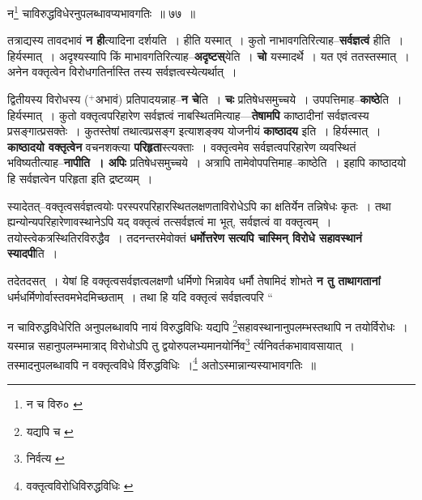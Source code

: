 \documentclass[article,12pt,a4paper]{memoir}
\newcommand{\add}[1]{($^{+}$#1)}
\begin{document}
	  \endgroup
	
	  \bigskip
	  \begingroup
	

	  \pstart न\footnote{न च विरु० \cite{dp-msC}} चाविरुद्धविधेरनुपलब्धावप्यभावगतिः ॥ ७७ ॥
	\pend
      
	  \endgroup
	

	  \pstart तत्राद्यस्य तावदभावं \textbf{न ही}त्यादिना दर्शयति । हीति यस्मात् । कुतो नाभावगतिरित्याह--\textbf{सर्वज्ञत्वं} हीति । हिर्यस्मात् । अदृश्यस्यापि किं माभावगतिरित्याह--\textbf{अदृष्टस्}येति । \textbf{चो} यस्मादर्थे । यत एवं ततस्तस्मात् । अनेन वक्तृत्वेन विरोधगतिर्नास्ति तस्य सर्वज्ञत्वस्येत्यर्थात् ।
	\pend
      

	  \pstart द्वितीयस्य विरोधस्य \add{अभावं} प्रतिपादयन्नाह--\textbf{न चे}ति । \textbf{चः} प्रतिषेधसमुच्चये । उपपत्तिमाह--\textbf{काष्ठे}ति । हिर्यस्मात् । कुतो वक्तृत्वपरिहारेण सर्वज्ञत्वं नाबस्थितमित्याह—\textbf{तेषामपि} काष्ठादीनां सर्वज्ञत्वस्य प्रसङ्गात्प्रसक्तेः । कुतस्तेषां तथात्वप्रसङ्ग इत्याशङ्क्य योजनीयं \textbf{काष्ठादय} इति । हिर्यस्मात् । \textbf{काष्ठादयो वक्तृत्वेन} वचनशक्त्या \textbf{परिहृता}स्त्यक्ताः । वक्तृत्वमेव सर्वज्ञत्वपरिहारेण व्यवस्थितं भविष्यतीत्याह--\textbf{नापीति । अपिः} प्रतिषेधसमुच्चये । अत्रापि तामेवोपपत्तिमाह--काष्ठेति । इहापि काष्ठादयो हि सर्वज्ञत्वेन परिहृता इति द्रष्टव्यम् ।
	\pend
      

	  \pstart स्यादेतत्--वक्तृत्वसर्वज्ञत्वयोः परस्परपरिहारस्थितलक्षणताविरोधेऽपि का क्षतिर्येन तन्निषेधः कृतः । तथा ह्यन्योन्यपरिहारेणावस्थानेऽपि यद् वक्तृत्वं तत्सर्वज्ञत्वं मा भूत्, सर्वज्ञत्वं वा वक्तृत्वम् । तयोस्त्वेकत्रस्थितिरविरुद्धैव । तदनन्तरमेवोक्तं \textbf{धर्मोत्तरेण} \leavevmode{} \textbf{सत्यपि चास्मिन् विरोधे सहावस्थानं स्यादपी}ति ।
	\pend
      

	  \pstart तदेतदसत् । येषां हि वक्तृत्वसर्वज्ञत्वलक्षणौ धर्मिणो भिन्नावेव धर्मौ तेषामिदं शोभते \textbf{न तु ताथागतानां} धर्मधर्मिणोर्वास्तवमभेदमिच्छताम् । तथा हि यदि वक्तृत्वं सर्वज्ञत्वपरि  \leavevmode{} “
	  
	न चाविरुद्धविधेरिति अनुपलब्धावपि नायं विरुद्धविधिः यद्यपि \footnote{यद्यपि च \cite{dp-msA} \cite{dp-msB} \cite{dp-edP} \cite{dp-edH} \cite{dp-edE} \cite{dp-edN}}\-सहावस्थानानुपलम्भस्तथापि न तयोर्विरोधः । यस्मान्न सहानुपलम्भमात्राद् विरोधोऽपि तु द्वयोरुपलभ्यमानयोर्निव\footnote{निर्वत्य \cite{dp-msA}} र्त्यनिवर्तकभावावसायात् । तस्मादनुपलब्धावपि न वक्तृत्वविधे र्विरुद्धविधिः ।\footnote{वक्तृत्वविरोधिविरुद्धविधिः \cite{dp-msA} \cite{dp-msB} \cite{dp-edP} \cite{dp-edH} \cite{dp-edN}} अतोऽस्मान्नान्यस्याभावगतिः ॥ 
	  
\end{document}
